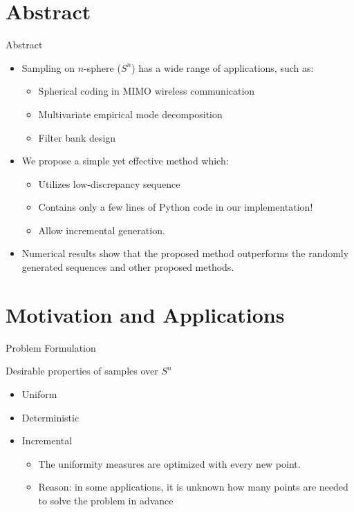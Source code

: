 \hypertarget{abstract}{%
\section{Abstract}\label{abstract}}

\begin{frame}{Abstract}
\protect\hypertarget{abstract-1}{}

\begin{itemize}
\item
  Sampling on \(n\)-sphere (\(S^n\)) has a wide range of applications,
  such as:

  \begin{itemize}
  \item
    Spherical coding in MIMO wireless communication
  \item
    Multivariate empirical mode decomposition
  \item
    Filter bank design
  \end{itemize}
\item
  We propose a simple yet effective method which:

  \begin{itemize}
  \item
    Utilizes low-discrepancy sequence
  \item
    Contains only a few lines of Python code in our implementation!
  \item
    Allow incremental generation.
  \end{itemize}
\item
  Numerical results show that the proposed method outperforms the
  randomly generated sequences and other proposed methods.
\end{itemize}

\end{frame}

\hypertarget{motivation-and-applications}{%
\section{Motivation and
Applications}\label{motivation-and-applications}}

\begin{frame}{Problem Formulation}
\protect\hypertarget{problem-formulation}{}

Desirable properties of samples over \(S^n\)

\begin{itemize}
\item
  Uniform
\item
  Deterministic
\item
  Incremental

  \begin{itemize}
  \item
    The uniformity measures are optimized with every new point.
  \item
    Reason: in some applications, it is unknown how many points are
    needed to solve the problem in advance
  \end{itemize}
\end{itemize}

\end{frame}

